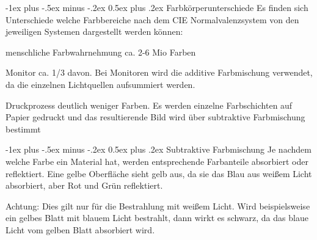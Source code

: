 \documentclass[landscape]{article}
\makeatletter
\renewcommand{\section}{\@startsection{section}{1}{0mm}%
                                {-1ex plus -.5ex minus -.2ex}%
                                {0.5ex plus .2ex}%
                                {\normalfont\large\bfseries}}
\makeatother
\begin{document}
\begin{multicols}{3}
  \section{Farbkörperunterschiede}
  Es finden sich Unterschiede welche Farbbereiche nach dem CIE Normalvalenzsystem von den jeweiligen Systemen dargestellt werden können:
  \begin{itemize*}
    \item menschliche Farbwahrnehmung ca. 2-6 Mio Farben
    \item Monitor ca. 1/3 davon. Bei Monitoren wird die additive Farbmischung verwendet, da die einzelnen Lichtquellen aufsummiert werden.
    \item Druckprozess deutlich weniger Farben. Es werden einzelne Farbschichten auf Papier gedruckt und das resultierende Bild wird über subtraktive Farbmischung bestimmt
  \end{itemize*}
  
  \section{Subtraktive Farbmischung}
  Je nachdem welche Farbe ein Material hat, werden entsprechende Farbanteile absorbiert oder reflektiert. Eine gelbe Oberfläche sieht gelb aus, da sie das Blau aus weißem Licht absorbiert, aber Rot und Grün reflektiert.
  
  Achtung: Dies gilt nur für die Bestrahlung mit weißem Licht. Wird beispielsweise ein gelbes Blatt mit blauem Licht bestrahlt, dann wirkt es schwarz, da das blaue Licht vom gelben Blatt absorbiert wird.
  
\end{multicols}
\newpage
\end{document}
